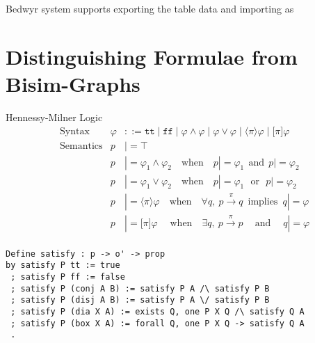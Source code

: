 \documentclass{llncs}
\begin{document}
Bedwyr system supports exporting the table data and importing as

\section{Distinguishing Formulae from Bisim-Graphs}\label{sec:ccsdf}
Hennessy-Milner Logic
\begin{align*}
&\text{Syntax} &
\varphi & ::= \texttt{tt} \mid \texttt{ff}
    \mid \varphi \land \varphi \mid \varphi \lor \varphi
    \mid \langle\pi\rangle \varphi \mid \lbrack\pi\rbrack \varphi
\\
&\text{Semantics} &
  p & |= \top \\&&
  p & |= \varphi_1 \land \varphi_2 \quad\text{when}\quad p |= \varphi_1 ~~\text{and}~~ p |= \varphi_2 \\&&
  p & |= \varphi_1 \lor \varphi_2 \quad\text{when}\quad p |= \varphi_1 ~~~\text{or}~~~ p |= \varphi_2 \\&&
  p & |= \langle \pi \rangle \varphi \quad\text{when}\quad \forall q,~ p\xrightarrow{\pi} q ~\;\text{implies}~\; q |= \varphi \\&&
  p & |= \lbrack \pi \rbrack \varphi \;\quad\text{when}\quad \exists q,~ p\xrightarrow{\pi} p ~\quad\text{and}\quad\; q |= \varphi \\&&
\end{align*}

\begin{verbatim}
Define satisfy : p -> o' -> prop
by satisfy P tt := true
 ; satisfy P ff := false
 ; satisfy P (conj A B) := satisfy P A /\ satisfy P B
 ; satisfy P (disj A B) := satisfy P A \/ satisfy P B
 ; satisfy P (dia X A) := exists Q, one P X Q /\ satisfy Q A
 ; satisfy P (box X A) := forall Q, one P X Q -> satisfy Q A
 .
\end{verbatim}
\end{document}
